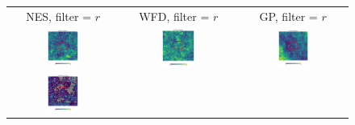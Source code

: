 \documentclass[preprintm,linenumbers]{aastex631}
\begin{document}
  
  	\begin{figure}
			\centering
			\begin{tabular}{  c c c}
                 NES, filter = $r$ & WFD, filter = $r$ & GP, filter = $r$ \\
				\includegraphics[width=0.3\textwidth]{results/skymaps_cutout/skymaps_cutout_first_year_one_snap_v4_0_10yrs_db_noDD_noTwi_nside-256_CountMetric_r_NES_noDD_noTwi.pdf} &
				\includegraphics[width=0.3\textwidth]{results/skymaps_cutout/skymaps_cutout_first_year_one_snap_v4_0_10yrs_db_noDD_noTwi_nside-256_CountMetric_r_WFD_noDD_noTwi.pdf} &
				\includegraphics[width=0.3\textwidth]{results/skymaps_cutout/skymaps_cutout_first_year_one_snap_v4_0_10yrs_db_noDD_noTwi_nside-256_CountMetric_r_GP_noDD_noTwi.pdf} \\
				\includegraphics[width=0.3\textwidth]{results/skymaps_cutout/skymaps_cutout_first_year_one_snap_v4_0_10yrs_db_noDD_noTwi_tscale-14_nside-256_doAllTemplateMetrics_reduceCount_r_NES_noDD_noTwi.pdf} &

\end{tabular}
\end{figure}
\end{document}
